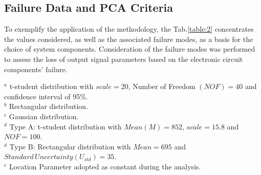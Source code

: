 \documentclass{ws-m3as}
\begin{document}
\subsection{Failure Data and PCA Criteria}

To exemplify the application of the methodology, the Tab.\ref{table:2} concentrates the values considered, as well as the associated failure modes, as a basis for the choice of system components. Consideration of the failure modes was performed to assess the loss of output signal parameters based on the electronic circuit components' failure.

\begin{table}[H] 
	\caption{Circuit Components Data}
	\label{table:2}
	\begin{center}
	\end{center}
	\footnotesize{$^{a}$ t-student distribution with $scale=20$, Number of Freedom $(NOF)=40$ and confidence interval of 95\%.}\\	
	\footnotesize{$^{b}$ Rectangular distribution.}\\
	\footnotesize{$^{c}$ Gaussian distribution.}\\	
	\footnotesize{$^{d}$ Type A: t-student distribution with $Mean (M) = 852$, $scale= 15.8$ and $NOF= 100$.}\\
	\footnotesize{$^{d}$ Type B: Rectangular distribution with $Mean=695$ and $Standard \hspace{2pt} Uncertainty (U_{std}) =35$.}\\
	\footnotesize{$^{e}$ Location Parameter adopted as constant during the analysis.}
\end{table}
\end{document}

